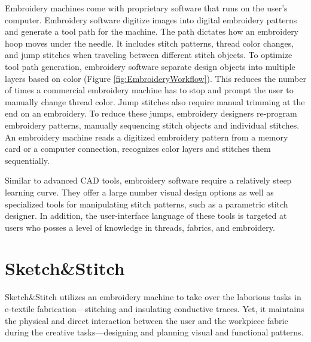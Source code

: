 \documentclass[header.tex]{subfiles}
\begin{document}
Embroidery machines come with proprietary software that runs on the user's computer. Embroidery software digitize images into digital embroidery patterns and generate a tool path for the machine. The path dictates how an embroidery hoop moves under the needle. It includes stitch patterns, thread color changes, and jump stitches when traveling between different stitch objects. To optimize tool path generation, embroidery software separate design objects into multiple layers based on color (Figure \ref{fig:EmbroideryWorkflow}). This reduces the number of times a commercial embroidery machine has to stop and prompt the user to manually change thread color. Jump stitches also require manual trimming at the end on an embroidery. To reduce these jumps, embroidery designers re-program embroidery patterns, manually sequencing stitch objects and individual stitches. 
An embroidery machine reads a digitized embroidery pattern from a memory card or a computer connection, recognizes color layers and stitches them sequentially.


Similar to advanced CAD tools, embroidery software require a relatively steep learning curve. They offer a large number visual design options as well as specialized tools for manipulating stitch patterns, such as a parametric stitch designer. %
In addition, the user-interface language of these tools is targeted at users who posses a level of knowledge in threads, fabrics, and embroidery.





\section{Sketch\&Stitch}
Sketch\&Stitch utilizes an embroidery machine to take over the laborious tasks in e-textile fabrication---stitching and insulating conductive traces. Yet, it maintains the physical and direct interaction between the user and the workpiece fabric during the creative tasks---designing and planning visual and functional patterns. 
\end{document}
